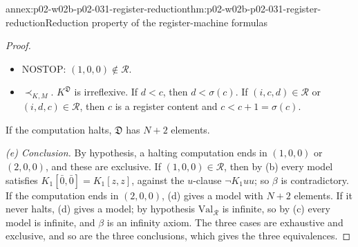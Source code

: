 \begin{annexitem}{annex:p02-w02b-p02-031-register-reduction}{thm:p02-w02b-p02-031-register-reduction}{Reduction property of the register-machine formulas}
\begin{proof}
\begin{itemize}
      \(d=0\) and \(A_{l+1}(\sigma(l),0)=A_{l+1}(l+1,0)\) holds; if
      \(A_m(c,d)\), then \((c,d)=(m,0)\) and \(K_0(m,0)\) holds.
\item \(\mathrm{NOSTOP}\): \((1,0,0)\notin\mathcal R\).
\item \(\prec_{K,M}\).  \(K^{\mathfrak D}\) is irreflexive.  If \(d<c\), then
      \(d<\sigma(c)\).  If \((i,c,d)\in\mathcal R\) or \((i,d,c)\in
      \mathcal R\), then \(c\) is a register content and \(c<c+1=\sigma(c)\).
\end{itemize}
If the computation halts, \(\mathfrak D\) has \(N+2\) elements.

\emph{(e) Conclusion.}  By hypothesis, a halting computation ends in
\((1,0,0)\) or \((2,0,0)\), and these are exclusive.  If
\((1,0,0)\in\mathcal R\), then by (b) every model satisfies
\(K_1[\bar0,\bar0]=K_1[z,z]\), against the \(u\)-clause \(\neg K_1uu\); so
\(\beta\) is contradictory.  If the computation ends in \((2,0,0)\), (d)
gives a model with \(N+2\) elements.  If it never halts, (d) gives a model;
by hypothesis \(\mathrm{Val}_{\mathcal R}\) is infinite, so by (c) every model
is infinite, and \(\beta\) is an infinity axiom.  The three cases are
exhaustive and exclusive, and so are the three conclusions, which gives the
three equivalences.
\end{proof}
\end{annexitem}

